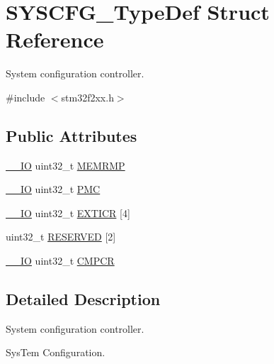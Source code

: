 \hypertarget{struct_s_y_s_c_f_g___type_def}{\section{S\-Y\-S\-C\-F\-G\-\_\-\-Type\-Def Struct Reference}
\label{struct_s_y_s_c_f_g___type_def}
}


System configuration controller.  




{\ttfamily \#include $<$stm32f2xx.\-h$>$}

\subsection*{Public Attributes}
\begin{DoxyCompactItemize}
\item 
\hyperlink{group___c_m_s_i_s__core__definitions_gaec43007d9998a0a0e01faede4133d6be}{\-\_\-\-\_\-\-I\-O} uint32\-\_\-t \hyperlink{struct_s_y_s_c_f_g___type_def_a85b9d3df2274b730327b181c402a7bf5}{M\-E\-M\-R\-M\-P}
\item 
\hyperlink{group___c_m_s_i_s__core__definitions_gaec43007d9998a0a0e01faede4133d6be}{\-\_\-\-\_\-\-I\-O} uint32\-\_\-t \hyperlink{struct_s_y_s_c_f_g___type_def_ab5c47c570566cb8ff9d0436c17cc9241}{P\-M\-C}
\item 
\hyperlink{group___c_m_s_i_s__core__definitions_gaec43007d9998a0a0e01faede4133d6be}{\-\_\-\-\_\-\-I\-O} uint32\-\_\-t \hyperlink{struct_s_y_s_c_f_g___type_def_a348aafac7a09a6e93e73e5acbccc34d3}{E\-X\-T\-I\-C\-R} \mbox{[}4\mbox{]}
\item 
uint32\-\_\-t \hyperlink{struct_s_y_s_c_f_g___type_def_a2c8da921a5c327428a03507ed299a37f}{R\-E\-S\-E\-R\-V\-E\-D} \mbox{[}2\mbox{]}
\item 
\hyperlink{group___c_m_s_i_s__core__definitions_gaec43007d9998a0a0e01faede4133d6be}{\-\_\-\-\_\-\-I\-O} uint32\-\_\-t \hyperlink{struct_s_y_s_c_f_g___type_def_ada13497abc6402300570ff5f430a612e}{C\-M\-P\-C\-R}
\end{DoxyCompactItemize}


\subsection{Detailed Description}
System configuration controller. 

Sys\-Tem Configuration. 

